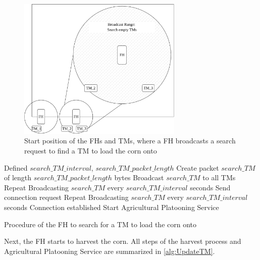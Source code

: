 \begin{figure}[H]%
   \centering
   \includegraphics[width=0.7\textwidth]{figures/platoonINIT}
   \caption{Start position of the \acf{FH}s and \acf{TM}s, where a \ac{FH} broadcasts a search request to find
   a \ac{TM} to load the corn onto}
   \label{fig:PlatooningInit}%
\end{figure}

\begin{algorithm}
\begin{algorithmic}[1]
\REQUIRE Defined $search\_TM\_interval$, $search\_TM\_packet\_length$
\STATE Create packet $search\_TM$ of length $search\_TM\_packet\_length$ bytes
\STATE Broadcast $search\_TM$ to all \acs{TM}s
    \STATE Repeat Broadcasting $search\_TM$ every $search\_TM\_interval$ seconds
\ELSE
   \STATE Send connection request
      \STATE Repeat Broadcasting $search\_TM$ every $search\_TM\_interval$ seconds
   \ELSE
      \STATE Connection established
      \STATE Start Agricultural Platooning Service
   \ENDIF
\ENDIF
\end{algorithmic}
\caption{Procedure of the \acf{FH} to search for a \acf{TM} to load the corn onto}
\label{alg:SearchTM}
\end{algorithm}

Next, the \ac{FH} starts to harvest the corn.
All steps of the harvest process and Agricultural Platooning Service are summarized in
\autoref{alg:UpdateTM}.


